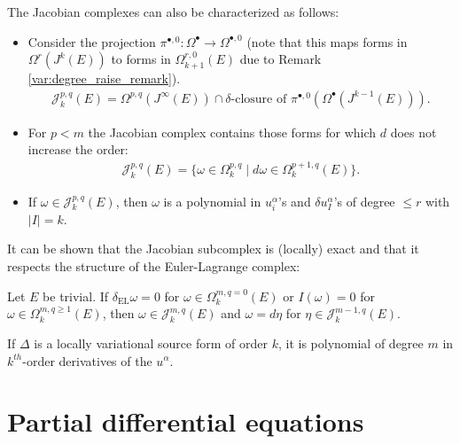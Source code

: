     \begin{property}
        The Jacobian complexes can also be characterized as follows:
        \begin{itemize}
            \item Consider the projection $\pi^{\bullet,0}:\Omega^\bullet\rightarrow\Omega^{\bullet,0}$ (note that this maps forms in $\Omega^r(J^k(E))$ to forms in $\Omega^{r,0}_{k+1}(E)$ due to Remark \ref{var:degree_raise_remark}).
            \begin{gather}
                \mathcal{J}^{p,q}_k(E) = \Omega^{p,q}(J^\infty(E))\cap\delta\text{-closure of }\pi^{\bullet,0}\left(\Omega^\bullet(J^{k-1}(E))\right).
            \end{gather}
            \item For $p<m$ the Jacobian complex contains those forms for which $d$ does not increase the order:
            \begin{gather}
                \mathcal{J}^{p,q}_k(E) = \{\omega\in\Omega^{p,q}_k\mid d\omega\in\Omega^{p+1,q}_k(E)\}.
            \end{gather}
            \item If $\omega\in\mathcal{J}^{p,q}_k(E)$, then $\omega$ is a polynomial in $u^\alpha_i$'s and $\delta u^\alpha_I$'s of degree $\leq r$ with $|I|=k$.
        \end{itemize}
    \end{property}

    It can be shown that the Jacobian subcomplex is (locally) exact and that it respects the structure of the Euler-Lagrange complex:
    \begin{property}[Exactness]
        Let $E$ be trivial. If $\delta_\mathrm{EL}\omega=0$ for $\omega\in\Omega^{m,q=0}_k(E)$ or $I(\omega)=0$ for $\omega\in\Omega^{m,q\geq1}_k(E)$, then $\omega\in\mathcal{J}^{m,q}_k(E)$ and $\omega=d\eta$ for $\eta\in\mathcal{J}^{m-1,q}_k(E)$.
    \end{property}

    \begin{property}
        If $\Delta$ is a locally variational source form of order $k$, it is polynomial of degree $m$ in $k^{th}$-order derivatives of the $u^\alpha$.
    \end{property}

\section{Partial differential equations}
